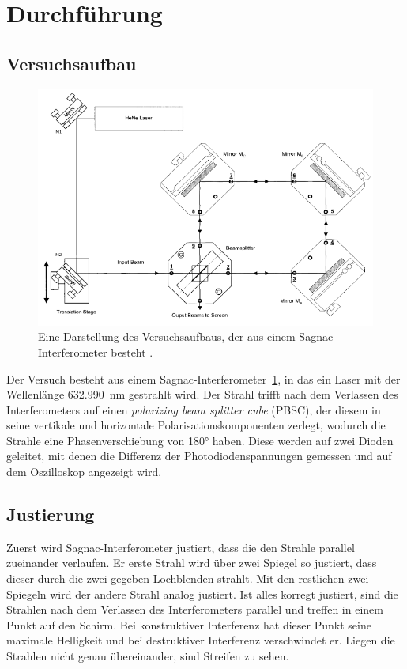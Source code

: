 \section{Durchführung}
\label{sec:Durchführung}
\subsection{Versuchsaufbau}
\begin{figure}[h]
    \centering
    \includegraphics[width = \textwidth]{bild/Aufbau.png}
    \caption{Eine Darstellung des Versuchsaufbaus, der aus einem Sagnac-Interferometer besteht \cite{V64}.}
    \label{fig:Aufbau}
\end{figure}

\noindent
Der Versuch besteht aus einem Sagnac-Interferometer~\ref{fig:Aufbau},
in das ein Laser mit der Wellenlänge \SI{632.990}{\nano\metre} gestrahlt wird. 
Der Strahl trifft nach dem Verlassen des Interferometers auf einen 
\textit{polarizing beam splitter cube} (PBSC), 
der diesem in seine vertikale und horizontale Polarisationskomponenten zerlegt,
wodurch die Strahle eine Phasenverschiebung von 180° haben.
Diese werden auf zwei Dioden geleitet,
mit denen die Differenz der Photodiodenspannungen gemessen 
und auf dem Oszilloskop angezeigt wird.

\subsection{Justierung}%
Zuerst wird Sagnac-Interferometer justiert,
dass die den Strahle parallel zueinander verlaufen.
Er erste Strahl wird über zwei Spiegel so justiert,
dass dieser durch die zwei gegeben Lochblenden strahlt.
Mit den restlichen zwei Spiegeln wird der andere Strahl analog justiert.
 \newline
\noindent Ist alles korregt justiert,
sind die Strahlen nach dem Verlassen des Interferometers parallel und
treffen in einem Punkt auf den Schirm.
Bei konstruktiver Interferenz hat dieser Punkt seine maximale Helligkeit 
und bei destruktiver Interferenz verschwindet er.
Liegen die Strahlen nicht genau übereinander, sind Streifen zu sehen. 

